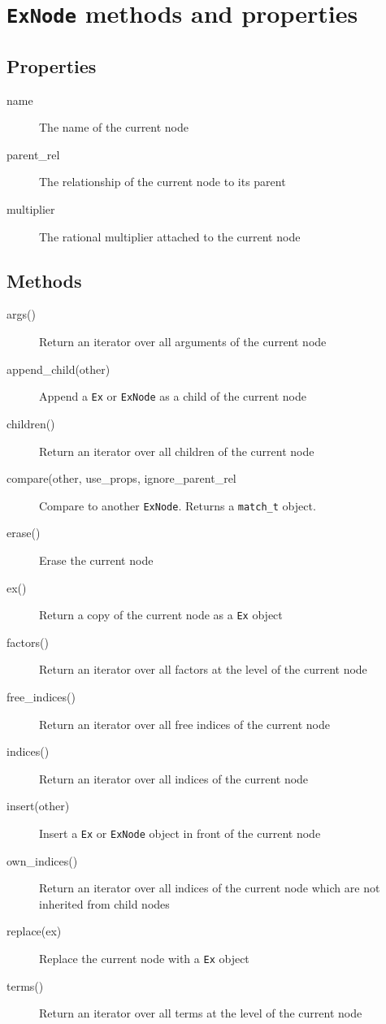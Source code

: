 \documentclass{article}
\begin{document}
\newpage
\section{\texttt{ExNode} methods and properties}
\label{app:exnode}

\renewcommand{\descriptionlabel}[1]{\hspace{\labelsep}\textbf{\texttt{#1}}}
\subsection{Properties}
\begin{description}
	\item[name] 
		The name of the current node
	\item[parent\_rel] 
		The relationship of the current node to its parent
	\item[multiplier]
		The rational multiplier attached to the current node
\end{description}
\subsection{Methods}
\begin{description}
	\item[args()]
		Return an iterator over all arguments of the current node
	\item[append\_child(other)] 
		Append a \texttt{Ex} or \texttt{ExNode} as a child of the current node
	\item[children()]
		Return an iterator over all children of the current node
	\item[compare(other, use\_props, ignore\_parent\_rel] 
		Compare to another \texttt{ExNode}. Returns a \texttt{match\_t} object.
	\item[erase()] 
		Erase the current node
	\item[ex()] 
		Return a copy of the current node as a \texttt{Ex} object
	\item[factors()]
		Return an iterator over all factors at the level of the current node
	\item[free\_indices()]
		Return an iterator over all free indices of the current node
	\item[indices()]
		Return an iterator over all indices of the current node
	\item[insert(other)]
		Insert a \texttt{Ex} or \texttt{ExNode} object in front of the current node
	\item[own\_indices()]
		Return an iterator over all indices of the current node which are not inherited from child nodes
	\item[replace(ex)]
		Replace the current node with a \texttt{Ex} object
	\item[terms()]
		Return an iterator over all terms at the level of the current node
\end{description}
\end{document}

